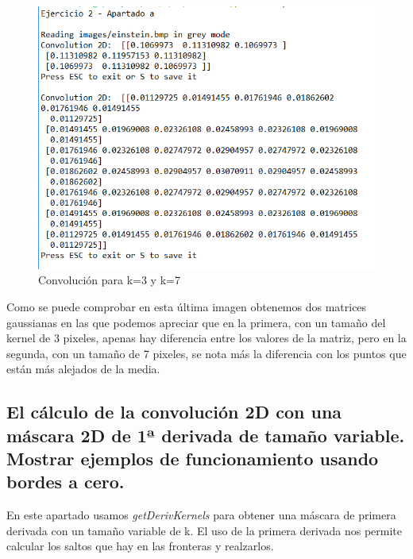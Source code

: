 \documentclass{article}
\begin{document}
\begin{figure}[h]
\centering
\includegraphics[scale=0.8]{2a3.PNG}
\caption{Convolución para k=3 y k=7}
\end{figure}


\newpage
Como se puede comprobar en esta última imagen obtenemos dos matrices gaussianas en las que podemos apreciar que en la primera, con un tamaño del kernel de 3 pixeles, apenas hay diferencia entre los valores de la matriz, pero en la segunda, con un tamaño de 7 pixeles, se nota más la diferencia con los puntos que están más alejados de la media.


\newpage
\subsection{El cálculo de la convolución 2D con una máscara 2D de 1ª derivada de tamaño variable. Mostrar ejemplos de funcionamiento usando bordes a cero.}

En este apartado usamos \textit{getDerivKernels} para obtener una máscara de primera derivada con un tamaño variable de k. El uso de la primera derivada nos permite calcular los saltos que hay en las fronteras y realzarlos.
\end{document}
